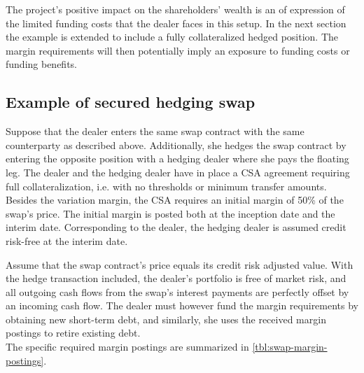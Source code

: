 \documentclass[main.tex]{subfiles}
\begin{document}
            The project's positive impact on the shareholders' wealth is an of expression of the limited funding costs
            that the dealer faces in this setup.
            In the next section the example is extended to include a fully collateralized hedged position.
            The margin requirements will then potentially imply an exposure to funding costs or funding benefits.

        \subsection{Example of secured hedging swap}
            Suppose that the dealer enters the same swap contract with the same counterparty as described above.
            Additionally, she hedges the swap contract by entering the opposite position with a hedging dealer
            where she pays the floating leg.
            The dealer and the hedging dealer have in place a CSA agreement 
            requiring full collateralization, i.e. with no thresholds or minimum transfer amounts.
            Besides the variation margin,
            the CSA requires an initial margin of 50\% of the swap's price.
            The initial margin is posted both at the inception date and the interim date.
            Corresponding to the dealer, the hedging dealer is assumed credit risk-free at the interim date.

            Assume that the swap contract's price equals its credit risk adjusted value.
            With the hedge transaction included,
            the dealer's portfolio is free of market risk,
            and all outgoing cash flows from the swap's interest payments
            are perfectly offset by an incoming cash flow.
            The dealer must however fund the margin requirements by obtaining new short-term debt,
            and similarly, she uses the received margin postings to retire existing debt.
            \\
            The specific required margin postings are summarized in \cref{tbl:swap-margin-postings}.
\end{document}
